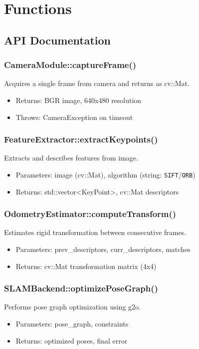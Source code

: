 %
%

\chapter{Functions}

\section{API Documentation}

\subsection{CameraModule::captureFrame()}
Acquires a single frame from camera and returns as cv::Mat.
\begin{itemize}
    \item Returns: BGR image, 640x480 resolution
    \item Throws: CameraException on timeout
\end{itemize}

\subsection{FeatureExtractor::extractKeypoints()}
Extracts and describes features from image.
\begin{itemize}
    \item Parameters: image (cv::Mat), algorithm (string: \texttt{SIFT}/\texttt{ORB})
    \item Returns: std::vector<KeyPoint>, cv::Mat descriptors
\end{itemize}

\subsection{OdometryEstimator::computeTransform()}
Estimates rigid transformation between consecutive frames.
\begin{itemize}
    \item Parameters: prev\_descriptors, curr\_descriptors, matches
    \item Returns: cv::Mat transformation matrix (4x4)
\end{itemize}

\subsection{SLAMBackend::optimizePoseGraph()}
Performs pose graph optimization using g2o.
\begin{itemize}
    \item Parameters: pose\_graph, constraints
    \item Returns: optimized poses, final error
\end{itemize}

